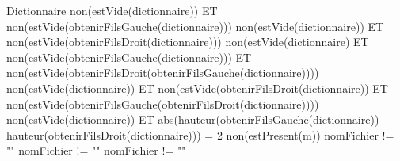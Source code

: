 \begin{tad}
	\begin{tadPreconditions}{Dictionnaire}
			{non(estVide(dictionnaire)) ET non(estVide(obtenirFilsGauche(dictionnaire)))}
			{non(estVide(dictionnaire)) ET non(estVide(obtenirFilsDroit(dictionnaire)))}
			{non(estVide(dictionnaire) ET non(estVide(obtenirFilsGauche(dictionnaire))) ET
non(estVide(obtenirFilsDroit(obtenirFilsGauche(dictionnaire))))}
			{non(estVide(dictionnaire)) ET non(estVide(obtenirFilsDroit(dictionnaire)) ET non(estVide(obtenirFilsGauche(obtenirFilsDroit(dictionnaire))))}
			{non(estVide(dictionnaire)) ET abs(hauteur(obtenirFilsGauche(dictionnaire)) - hauteur(obtenirFilsDroit(dictionnaire))) = 2}
			{non(estPresent(m))}
			{nomFichier != ""}
			{nomFichier != ""}
			{nomFichier != ""}
	\end{tadPreconditions}
	
\end{tad}
